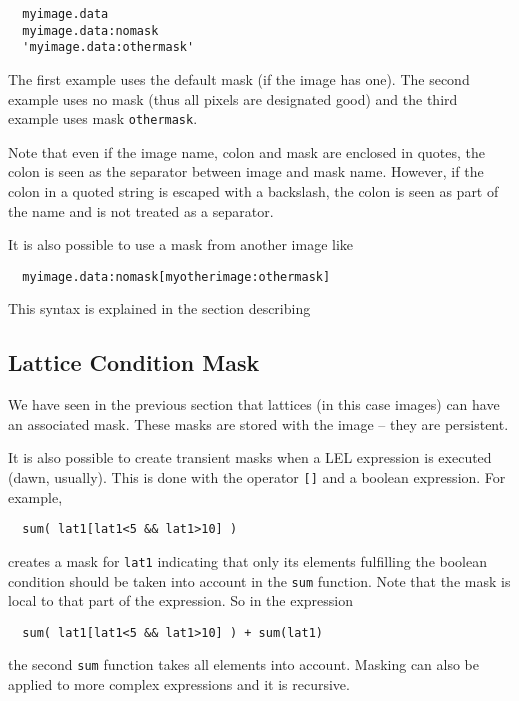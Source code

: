 \begin{verbatim}
  myimage.data
  myimage.data:nomask
  'myimage.data:othermask'
\end{verbatim}

\medskip\noindent
The first example uses the default mask (if the image has one).
The second example uses no mask (thus all pixels are designated good)
and the third example uses mask \texttt{othermask}.

\medskip\noindent
Note that even if the image name, colon and mask are enclosed in
quotes, the colon is seen as the separator between image and mask
name. However, if the colon in a quoted string is escaped with a
backslash, the colon is seen as part of the name and is not treated as
a separator.

\medskip\noindent
It is also possible to use a mask from another image like
\begin{verbatim}
  myimage.data:nomask[myotherimage:othermask]
\end{verbatim}
This syntax is explained in the section describing


\subsection{\label{LEL:CONDITIONS}Lattice Condition Mask}

We have seen in the previous section that lattices (in this case images)
can have an associated mask.  These masks are stored with the image --
they are persistent.  

\medskip\noindent It is also possible to create transient masks when a LEL expression is
executed (dawn, usually).  This is done with the operator \texttt{[]}
and a boolean expression.  For example,

\begin{verbatim}
  sum( lat1[lat1<5 && lat1>10] )
\end{verbatim}
creates a mask for {\tt lat1} indicating that only its elements fulfilling
the boolean condition should be taken into account in the \texttt{sum}
function.  Note that the mask is local to that part of the expression. So in
the expression

\begin{verbatim}
  sum( lat1[lat1<5 && lat1>10] ) + sum(lat1)
\end{verbatim}
the second \texttt{sum} function takes all elements into account.
Masking can also be applied to more complex expressions and it is recursive.

